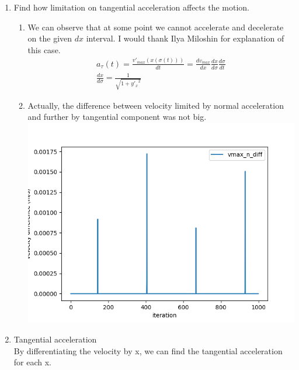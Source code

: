 \documentclass{article}
\begin{document}
\begin{enumerate}
\begin{enumerate}
            \end{enumerate}
      \item Find how limitation on tangential acceleration affects the motion.
            \begin{enumerate}
                  \item We can observe that at some point we cannot accelerate and decelerate on the given $dx$ interval.
                        I would thank Ilya Miloshin for explanation of this case.
                        \begin{align}
                              a_{\tau}(t) = \frac{v'_{max}(x(\sigma(t)))}{dt} = \frac{dv_{max}}{dx} \frac{dx}{d\sigma} \frac{d\sigma}{dt} \\
                              \frac{dx}{d\sigma} = \frac{1}{\sqrt{1 + {y'_{x}}^2}}
                        \end{align}
                  \item Actually, the difference between velocity limited by
                        normal acceleration and further by tangential component was not big. \\
                        \includegraphics[width=\linewidth]{veldiff.png}
            \end{enumerate}
      \item Tangential acceleration \\
            By differentiating the velocity by x, we can find the tangential acceleration for each x. \\

\end{enumerate}
\end{document}
